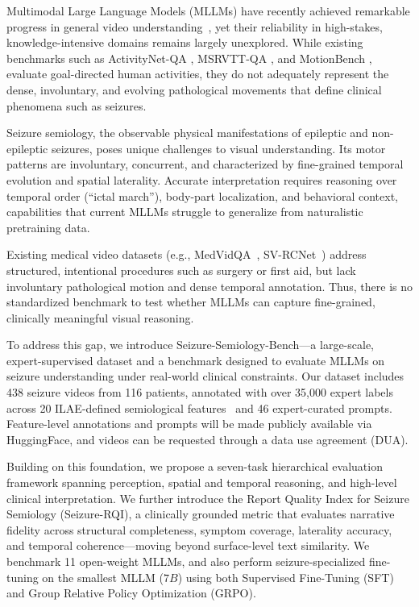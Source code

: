 \documentclass{article}
\theoremstyle{plain}
\theoremstyle{definition}
\theoremstyle{remark}
\begin{document}
\iffalse
Multimodal Large Language Models (MLLMs) have recently achieved remarkable progress in general video understanding~\cite{xu2025qwen3_omni,liu2025javisgpt,xun2025rtv}, yet their reliability in high-stakes, knowledge-intensive domains remains largely unexplored. 
While existing benchmarks such as  ActivityNet-QA \cite{Yu2019ActivityNetQA}, MSRVTT-QA \cite{Jun2016MSRVTT}, and MotionBench \cite{Hong2025MotionBench}, evaluate goal-directed human activities, they do not adequately represent the dense, involuntary, and evolving pathological movements that define clinical phenomena such as seizures.

Seizure semiology, the observable physical manifestations of epileptic and non-epileptic seizures, poses unique challenges to visual understanding. 
Its motor patterns are involuntary, concurrent, and characterized by fine-grained temporal evolution and spatial laterality. 
Accurate interpretation requires reasoning over temporal order (“ictal march”), body-part localization, and behavioral context, capabilities that current MLLMs struggle to generalize from naturalistic pretraining data.

Existing medical video datasets (e.g., MedVidQA~\cite{gupta2023medvidqa}, SV-RCNet~\cite{jin2018svrcnet}) address structured, intentional procedures such as surgery or first aid, but lack involuntary pathological motion and dense temporal annotation. 
Thus, there is no standardized benchmark to test whether MLLMs can capture fine-grained, clinically meaningful visual reasoning.

To address this gap, we introduce Seizure-Semiology-Bench---a large-scale, expert-supervised dataset and a benchmark designed to evaluate MLLMs on seizure understanding under real-world clinical constraints. 
Our dataset includes 438 seizure videos from 116 patients, annotated with over 35,000 expert labels across 20 ILAE-defined semiological features~\cite{beniczky2022seizuresemiology} and 46 expert-curated prompts. Feature-level annotations and prompts will be made publicly available via HuggingFace, and videos can be requested through a data use agreement (DUA).

Building on this foundation, we propose a seven-task hierarchical evaluation framework spanning perception, spatial and temporal reasoning, and high-level clinical interpretation.
We further introduce the Report Quality Index for Seizure Semiology (Seizure-RQI), a clinically grounded metric that evaluates narrative fidelity across structural completeness, symptom coverage, laterality accuracy, and temporal coherence—moving beyond surface-level text similarity. We benchmark 11 open-weight MLLMs, and also perform seizure-specialized fine-tuning on the smallest MLLM ($7B$) using both Supervised Fine-Tuning (SFT) and Group Relative Policy Optimization (GRPO). 
\end{document}
